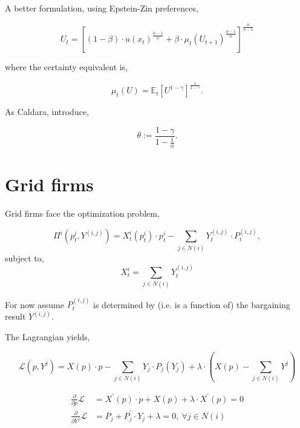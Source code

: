 \documentclass[american]{scrartcl}
\newcommand{\E}{\mathbb{E}}
\begin{document}
    A better formulation, using Epstein-Zin preferences,

    \begin{equation}
        U_t = \left[ (1 - \beta) \cdot u(x_t)^{\frac{\phi - 1}{\phi}} + \beta \cdot \mu_t(U_{t+1})^{\frac{\phi - 1}{\phi}} \right]^{\frac{\phi}{\phi - 1}}
    \end{equation}

    where the certainty equivalent is,

    \begin{equation}
        \mu_t(U) = \E_t\left[ U^{1 - \gamma} \right]^{\frac{1}{1 - \gamma}}.
    \end{equation}

    As Caldara, introduce,

    \begin{equation}
        \theta := \frac{1 - \gamma}{1 - \frac{1}{\phi}}.
    \end{equation}

\fi

\section{Grid firms}

Grid firms face the optimization problem,

\begin{equation}
    \Pi^i\left(p^i_t, Y^{(i, j)}\right) = X^i_{t}(p^i_t) \cdot p^i_t - \sum_{j \in N(i)} Y^{(i, j)}_{t} \cdot P^{(i, j)}_t,
\end{equation}
subject to,
\begin{equation}
    X^i_t=  \sum_{j \in N(i)} Y^{(i, j)}_{t}
\end{equation}

For now assume $P_t^{(i, j)}$ is determined by (i.e. is a function of) the bargaining result $Y^{(i, j)}$.

The Lagrangian yields,

\begin{equation}
    \mathcal{L}\left(p, Y^j\right) = X(p) \cdot p - \sum_{j \in N(i)} Y_j \cdot P_j (Y_j) + \lambda\cdot \left(X(p) - \sum_{j \in N(i)} Y^j\right)
\end{equation}


\begin{equation}
    \begin{split}
        \frac{\partial}{\partial p} \mathcal{L} &= X^\prime(p) \cdot p + X(p) + \lambda \cdot X^\prime(p) = 0 \\
        \frac{\partial}{\partial Y^j} \mathcal{L} &= P_j + P^\prime_j \cdot Y_j + \lambda =0, \ \forall j \in N(i)
    \end{split}
\end{equation}
\end{document}
